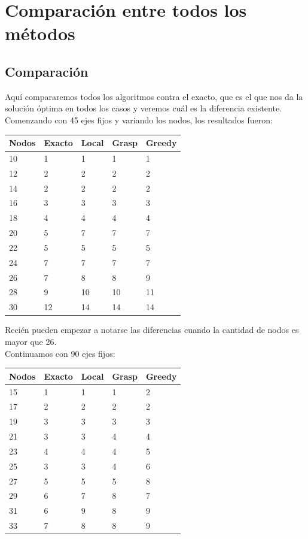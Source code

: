 \section{Comparaci\'on entre todos los m\'etodos} \label{ej6}

\subsection{Comparaci\'on}
Aqu\'i compararemos todos los algoritmos contra el exacto, que es el que nos da la soluci\'on \'optima en todos los casos y veremos cu\'al es la diferencia existente.\\

Comenzando con 45 ejes fijos y variando los nodos, los resultados fueron:\\

\begin{tabular}{| l | l | l | l | l |}
 \hline
Nodos&Exacto&Local&Grasp&Greedy \\ \hline
10&1&1&1&1 \\ \hline
12&2&2&2&2 \\ \hline
14&2&2&2&2 \\ \hline
16&3&3&3&3 \\ \hline
18&4&4&4&4 \\ \hline
20&5&7&7&7 \\ \hline
22&5&5&5&5 \\ \hline
24&7&7&7&7 \\ \hline
26&7&8&8&9 \\ \hline
28&9&10&10&11 \\ \hline
30&12&14&14&14 \\ \hline
\end{tabular}

Reci\'en pueden empezar a notarse las diferencias cuando la cantidad de nodos es mayor que 26.\\

Continuamos con 90 ejes fijos:

\begin{tabular}{| l | l | l | l | l |}
 \hline
Nodos&Exacto&Local&Grasp&Greedy \\ \hline
15&1&1&1&2 \\ \hline
17&2&2&2&2 \\ \hline
19&3&3&3&3 \\ \hline
21&3&3&4&4 \\ \hline
23&4&4&4&5 \\ \hline
25&3&3&4&6 \\ \hline
27&5&5&5&8 \\ \hline
29&6&7&8&7 \\ \hline
31&6&9&8&9 \\ \hline
33&7&8&8&9 \\ \hline
\end{tabular}

